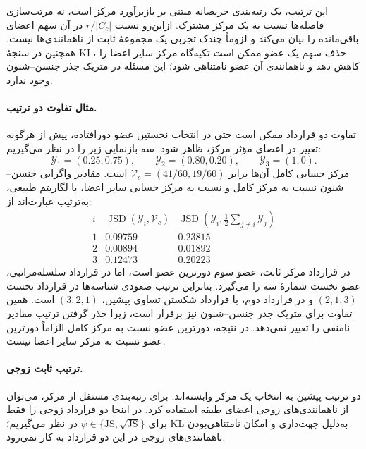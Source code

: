 این ترتیب، یک رتبه‌بندی حریصانه مبتنی بر
بازبرآورد مرکز است، نه مرتب‌سازی فاصله‌ها نسبت
به یک مرکز مشترک. ازاین‌رو نسبت $r/|C_c|$ در
آن سهم اعضای باقی‌مانده را بیان می‌کند و لزوماً
چندک تجربی یک مجموعهٔ ثابت از ناهمانندی‌ها نیست.
همچنین در سنجهٔ KL، حذف سهم یک عضو ممکن است
تکیه‌گاه مرکز سایر اعضا را کاهش دهد و ناهمانندی
آن عضو نامتناهی شود؛ این مسئله در متریک جذر
جنسن--شنون وجود ندارد.

\paragraph{مثال تفاوت دو ترتیب.}
تفاوت دو قرارداد ممکن است حتی در انتخاب نخستین
عضو دورافتاده، پیش از هرگونه تغییر در اعضای
مؤثر مرکز، ظاهر شود. سه بازنمایی زیر را در نظر
می‌گیریم:
\[
\mathscr Y_1=(0.25,0.75),\qquad
\mathscr Y_2=(0.80,0.20),\qquad
\mathscr Y_3=(1,0).
\]
مرکز حسابی کامل آن‌ها برابر
$\mathcal V_c=(41/60,19/60)$ است. مقادیر
واگرایی جنسن--شنون نسبت به مرکز کامل و نسبت
به مرکز حسابی سایر اعضا، با لگاریتم طبیعی،
به‌ترتیب عبارت‌اند از:
\begin{equation}\label{cmp:eq:ch3-ordering-example}
\begin{array}{c|cc}
i & \operatorname{JSD}(\mathscr Y_i,\mathcal V_c)
& \operatorname{JSD}\left(\mathscr Y_i,
\tfrac12\sum_{j\ne i}\mathscr Y_j\right)\\ \hline
1 & 0.09759 & 0.23815\\
2 & 0.00894 & 0.01892\\
3 & 0.12473 & 0.20223
\end{array}
\end{equation}
در قرارداد مرکز ثابت، عضو سوم دورترین عضو است،
اما در قرارداد سلسله‌مراتبی، عضو نخست شمارهٔ سه
را می‌گیرد. بنابراین ترتیب صعودی شناسه‌ها در
قرارداد نخست $(2,1,3)$ و در قرارداد دوم، با
قرارداد شکستن تساوی پیشین، $(3,2,1)$ است.
همین تفاوت برای متریک جذر جنسن--شنون نیز برقرار
است، زیرا جذر گرفتن ترتیب مقادیر نامنفی را
تغییر نمی‌دهد. در نتیجه، دورترین عضو نسبت به
مرکز کامل الزاماً دورترین عضو نسبت به مرکز
سایر اعضا نیست.

\paragraph{ترتیب ثابت زوجی.}
دو ترتیب پیشین به انتخاب یک مرکز وابسته‌اند.
برای رتبه‌بندی مستقل از مرکز، می‌توان از
ناهمانندی‌های زوجی اعضای طبقه استفاده کرد.
در اینجا دو قرارداد زوجی را فقط برای
$\psi\in\{\mathrm{JS},\sqrt{\mathrm{JS}}\}$
در نظر می‌گیریم؛ KL به‌دلیل جهت‌داری و امکان
نامتناهی‌بودن ناهمانندی‌های زوجی در این دو
قرارداد به کار نمی‌رود.

